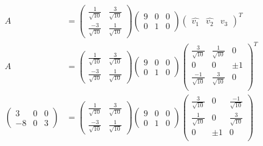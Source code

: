 \documentclass[11pt, a4paper]{article}
\begin{document}
\begin{align*}    
	A &= \begin{pmatrix}
	\frac{1}{\sqrt{10}} & \frac{3}{\sqrt{10}} \\
	\frac{-3}{\sqrt{10}} & \frac{1}{\sqrt{10}}
	\end{pmatrix}      \begin{pmatrix}
	9                    & 0                   & 0                    \\
	0                    & 1                   & 0                    
	\end{pmatrix} \begin{pmatrix}
	\hat{v_1}            & \hat{v_2}           & \hat{v_3}            
	\end{pmatrix}^T \\
	A &= \begin{pmatrix}
	\frac{1}{\sqrt{10}} & \frac{3}{\sqrt{10}} \\
	\frac{-3}{\sqrt{10}} & \frac{1}{\sqrt{10}}
	\end{pmatrix}      \begin{pmatrix}
	9                    & 0                   & 0                    \\
	0                    & 1                   & 0                    
	\end{pmatrix} \begin{pmatrix}
	\frac{3}{\sqrt{10}}  & \frac{1}{\sqrt{10}} & 0                    \\
	0                    & 0                   & \pm 1                \\
	\frac{-1}{\sqrt{10}} & \frac{3}{\sqrt{10}} & 0                    \\              
	\end{pmatrix}^T \\
	\begin{pmatrix}
	3                    & 0                   & 0                    \\
	-8                   & 0                   & 3                    
	\end{pmatrix} &= \begin{pmatrix}
	\frac{1}{\sqrt{10}} & \frac{3}{\sqrt{10}} \\
	\frac{-3}{\sqrt{10}} & \frac{1}{\sqrt{10}}
	\end{pmatrix}      \begin{pmatrix}
	9                    & 0                   & 0                    \\
	0                    & 1                   & 0                    
	\end{pmatrix} \begin{pmatrix}
	\frac{3}{\sqrt{10}}  & 0                   & \frac{-1}{\sqrt{10}} \\
	\frac{1}{\sqrt{10}}  & 0                   & \frac{3}{\sqrt{10}}  \\              
	0                    & \pm 1               & 0                    \\    
	\end{pmatrix}
\end{align*}
\end{document}
